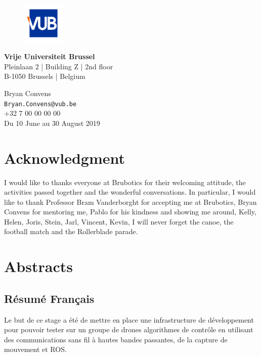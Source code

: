 \begin{titlepage}
 \vfill
 \begin{figure}[h!]
  \hspace{0.29cm}
  \includegraphics[width=2cm]{logos/vub_logo.jpg}
 \end{figure}
 \begin{minipage}{8cm}
  \textbf{Vrije Universiteit Brussel}\\
  Pleinlaan 2 | Building Z | 2nd floor\\
  B-1050 Brussels | Belgium
 \end{minipage} \hfill
 \begin{minipage}{7cm}
  \begin{flushright}
   Bryan Convens\\
   \texttt{Bryan.Convens@vub.be}\\
   +32 7 00 00 00 00\\ \vspace{0.2cm}
   Du 10 June au 30 August 2019
  \end{flushright}
 \end{minipage}

\end{titlepage}


\chapter*{Acknowledgment}
I would like to thanks everyone at Brubotics for their welcoming attitude,
the activities passed together and the wonderful conversations.
In particular, I would like to thank Professor Bram Vanderborght for accepting me at Brubotics,
Bryan Convens for mentoring me, Pablo for his kindness and showing me around,
Kelly, Helen, Joris, Stein, Jarl, Vincent, Kevin, I will never forget the canoe, the football match and the Rollerblade parade.

\chapter*{Abstracts}
\section*{Résumé Français}
Le but de ce stage a été de mettre en place une infrastructure de développement pour pouvoir tester sur un groupe de drones algorithmes de contrôle en utilisant des communications sans fil à hautes bandes passantes, de la capture de mouvement et ROS.

